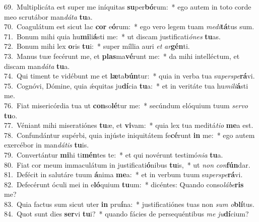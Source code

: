 {69.~}Multiplicáta est super me iníquitas \textbf{su}per\textbf{bó}rum:~* ego autem in toto corde meo scrutábor man\textit{dá}\textit{ta} \textbf{tu}a.\\
{70.~}Coagulátum est sicut lac \textbf{cor} e\textbf{ó}rum:~* ego vero legem tuam \textit{me}\textit{di}\textbf{tá}tus sum.\\
{71.~}Bonum mihi quia hu\textbf{mi}li\textbf{á}sti me:~* ut discam justificati\textit{ó}\textit{nes} \textbf{tu}as.\\
{72.~}Bonum mihi lex \textbf{o}ris \textbf{tu}i:~* super míllia auri \textit{et} \textit{ar}\textbf{gén}ti.\\
{73.~}Manus tuæ fecérunt me, et \textbf{plas}ma\textbf{vé}runt me:~* da mihi intelléctum, et discam man\textit{dá}\textit{ta} \textbf{tu}a.\\
{74.~}Qui timent te vidébunt me et \textbf{læ}ta\textbf{bún}tur:~* quia in verba tua su\textit{per}\textit{spe}\textbf{rá}vi.\\
{75.~}Cognóvi, Dómine, quia ǽquitas ju\textbf{dí}cia \textbf{tu}a:~* et in veritáte tua hu\textit{mi}\textit{li}\textbf{á}sti me.\\
{76.~}Fiat misericórdia tua ut \textbf{con}so\textbf{lé}tur me:~* secúndum elóquium tuum \textit{ser}\textit{vo} \textbf{tu}o.\\
{77.~}Véniant mihi miseratiónes \textbf{tu}æ, et \textbf{vi}vam:~* quia lex tua meditá\textit{ti}\textit{o} \textbf{me}a est.\\
{78.~}Confundántur supérbi, quia injúste iniquitátem fe\textbf{cé}runt \textbf{in} me:~* ego autem exercébor in man\textit{dá}\textit{tis} \textbf{tu}is.\\
{79.~}Convertántur \textbf{mi}hi ti\textbf{mén}tes te:~* et qui novérunt testimó\textit{ni}\textit{a} \textbf{tu}a.\\
{80.~}Fiat cor meum immaculátum in justificati\textbf{ó}nibus \textbf{tu}is,~* ut \textit{non} \textit{con}\textbf{fún}dar.\\
{81.~}Defécit in salutáre tuum \textbf{á}nima \textbf{me}a:~* et in verbum tuum su\textit{per}\textit{spe}\textbf{rá}vi.\\
{82.~}Defecérunt óculi mei in e\textbf{ló}quium \textbf{tu}um:~* dicéntes: Quando conso\textit{lá}\textit{be}\textbf{ris} me?\\
{83.~}Quia factus sum sicut uter \textbf{in} pru\textbf{í}na:~* justificatiónes tuas non \textit{sum} \textit{o}\textbf{blí}tus.\\
{84.~}Quot sunt dies \textbf{ser}vi \textbf{tu}i?~* quando fácies de persequéntibus \textit{me} \textit{ju}\textbf{dí}cium?\\
